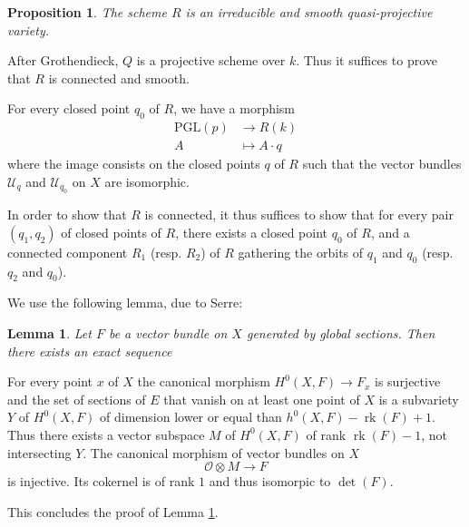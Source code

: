 \documentclass[12pt,a4paper]{book}
\DeclareMathOperator\rk{rk}
\def\OO{\mathscr{O}}
\def\UU{\mathscr{U}}
\def\PGL{\mathrm{PGL}}
\newtheorem{prop}[thm]{Proposition}
\newtheorem{lemma}[thm]{Lemma}
\theoremstyle{definition} \newtheorem{defn}[thm]{Definition}
\theoremstyle{definition} \newtheorem{ejs}[thm]{Examples}
\theoremstyle{definition} \newtheorem{ej}[thm]{Example}
\begin{document}
   \begin{prop}\label{1.23}
     The scheme $R$ is an irreducible and smooth quasi-projective variety.
   \end{prop}

   After Grothendieck, $Q$ is a projective scheme over $k$. Thus it suffices to prove that $R$ is connected and smooth.

   For every closed point $q_0$ of $R$, we have a morphism
   \begin{align*}
      \PGL(p) &\longrightarrow R(k)\\ 
       A &\longmapsto A\cdot q 
     \end{align*}
     where the image consists on the closed points $q$ of $R$ such that the vector bundles $\UU_q$ and $\UU_{q_0}$ on $X$ are isomorphic.

     In order to show that $R$ is connected, it thus suffices to show that for every pair $(q_1,q_2)$ of closed points of $R$, there exists a closed point $q_0$ of $R$, and a connected component $R_1$ (resp. $R_2$) of $R$ gathering the orbits of $q_1$ and $q_0$ (resp. $q_2$ and $q_0$).

     We use the following lemma, due to Serre:
     \begin{lemma}\label{1.24}
       Let $F$ be a vector bundle on $X$ generated by global sections. Then there exists an exact sequence
       \begin{center}
       \end{center}
     \end{lemma}

     For every point $x$ of $X$ the canonical morphism $H^0(X,F)\rightarrow F_x$ is surjective and the set of sections of $E$ that vanish on at least one point of $X$ is a subvariety $Y$ of $H^0(X,F)$ of dimension lower or equal than $h^0(X,F) - \rk(F) +1$. Thus there exists a vector subspace $M$ of $H^0(X,F)$ of rank $\rk(F)-1$, not intersecting $Y$. The canonical morphism of vector bundles on $X$
     \begin{equation*}
       \OO \otimes M \longrightarrow F
     \end{equation*}
     is injective. Its cokernel is of rank $1$ and thus isomorpic to $\det(F)$.

     This concludes the proof of Lemma \ref{1.24}. \\
\end{document}
